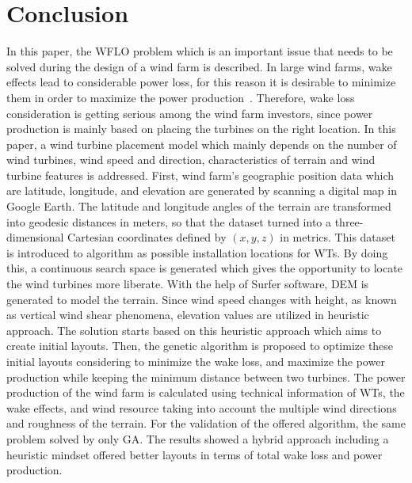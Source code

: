 \documentclass[]{iptconf}
\begin{document}
\section{Conclusion} \label{sec:conclusion}
In this paper, the WFLO problem which is an important issue that needs to be solved
during the design of a wind farm is described. In large wind farms, wake effects
lead to considerable power loss, for this reason it is desirable to minimize them in
order to maximize the power production~\cite{Samorani2011}. Therefore, wake loss consideration
is getting serious among the wind farm investors, since power production is mainly
based on placing the turbines on the right location. In this paper, a wind turbine
placement model which mainly depends on the number of wind turbines, wind speed
and direction, characteristics of terrain and wind turbine features is addressed. First,
wind farm's geographic position data which are latitude, longitude, and elevation
are generated by scanning a digital map in Google Earth. The latitude and longitude
angles of the terrain are transformed into geodesic distances in meters, so that the
dataset turned into a three-dimensional Cartesian coordinates defined by $(x, y, z)$
in metrics. This dataset is introduced to algorithm as possible installation locations
for WTs. By doing this, a continuous search space is generated which gives the
opportunity to locate the wind turbines more liberate. With the help of Surfer
software, DEM is generated to model the terrain. Since wind speed changes with
height, as known as vertical wind shear phenomena, elevation values are utilized
in heuristic approach. The solution starts based on this heuristic approach which
aims to create initial layouts. Then, the genetic algorithm is proposed to optimize
these initial layouts considering to minimize the wake loss, and maximize the power
production while keeping the minimum distance between two turbines. The power
production of the wind farm is calculated using technical information of WTs, the
wake effects, and wind resource taking into account the multiple wind directions
and roughness of the terrain. For the validation of the offered algorithm, the same
problem solved by only GA. The results showed a hybrid approach including a
heuristic mindset offered better layouts in terms of total wake loss and power
production.
\end{document}
